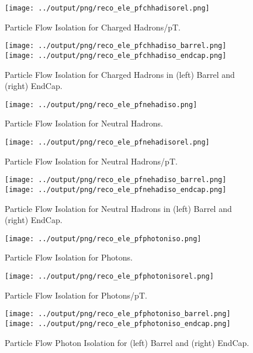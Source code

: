 \documentclass[11pt]{book}
\begin{document}
\begin{figure}[htb]
\centering
\texttt{[image: ../output/png/reco\_ele\_pfchhadisorel.png]}
\caption{Particle Flow Isolation for Charged Hadrons/pT.}
\label{fig:reco_ele_pfchhadiso_pt}
\end{figure}

\begin{figure}[ht]
\centering
\texttt{[image: ../output/png/reco\_ele\_pfchhadiso\_barrel.png]}
\texttt{[image: ../output/png/reco\_ele\_pfchhadiso\_endcap.png]}
\caption{Particle Flow Isolation for Charged Hadrons in (left) Barrel and (right) EndCap.}
\label{fig:reco_ele_pfchhadiso_regions}
\end{figure}

\begin{figure}[ht]
\centering
\texttt{[image: ../output/png/reco\_ele\_pfnehadiso.png]}
\caption{Particle Flow Isolation for Neutral Hadrons.}
\label{fig:reco_ele_pfnehadiso}
\end{figure}

\begin{figure}[htb]
\centering
\texttt{[image: ../output/png/reco\_ele\_pfnehadisorel.png]}
\caption{Particle Flow Isolation for Neutral Hadrons/pT.}
\label{fig:reco_ele_pfnehadiso_pt}
\end{figure}

\begin{figure}[ht]
\centering
\texttt{[image: ../output/png/reco\_ele\_pfnehadiso\_barrel.png]}
\texttt{[image: ../output/png/reco\_ele\_pfnehadiso\_endcap.png]}
\caption{Particle Flow Isolation for Neutral Hadrons in (left) Barrel and (right) EndCap.}
\label{fig:reco_ele_pfnehadiso_regions}
\end{figure}

\begin{figure}[ht]
\centering
\texttt{[image: ../output/png/reco\_ele\_pfphotoniso.png]}
\caption{Particle Flow Isolation for Photons.}
\label{fig:reco_ele_pfphotoniso}
\end{figure}

\begin{figure}[ht]
\centering
\texttt{[image: ../output/png/reco\_ele\_pfphotonisorel.png]}
\caption{Particle Flow Isolation for Photons/pT.}
\label{fig:reco_ele_pfphotoniso_pt}
\end{figure}

\begin{figure}[ht]
\centering
\texttt{[image: ../output/png/reco\_ele\_pfphotoniso\_barrel.png]}
\texttt{[image: ../output/png/reco\_ele\_pfphotoniso\_endcap.png]}
\caption{Particle Flow Photon Isolation for (left) Barrel and (right) EndCap.}
\label{fig:reco_ele_pfphotoniso_regions}
\end{figure}
\end{document}

